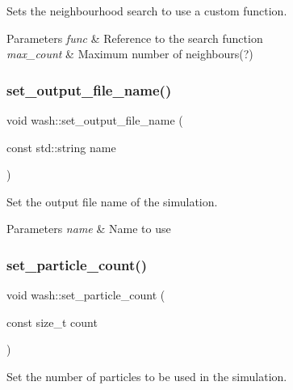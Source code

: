 Sets the neighbourhood search to use a custom function. 


\begin{DoxyParams}{Parameters}
{\em func} & Reference to the search function \\
\hline
{\em max\+\_\+count} & Maximum number of neighbours(?) \\
\hline
\end{DoxyParams}
\mbox{\label{namespacewash_ad6de17b9a27f58f6245a68ede303e84b}} 
\subsubsection{\texorpdfstring{set\+\_\+output\+\_\+file\+\_\+name()}{set\_output\_file\_name()}}
{\footnotesize\ttfamily void wash\+::set\+\_\+output\+\_\+file\+\_\+name (\begin{DoxyParamCaption}\item[{const std\+::string}]{name }\end{DoxyParamCaption})}



Set the output file name of the simulation. 


\begin{DoxyParams}{Parameters}
{\em name} & Name to use \\
\hline
\end{DoxyParams}
\mbox{\label{namespacewash_a20a6940ce5a881482fe472ed704f177e}} 
\subsubsection{\texorpdfstring{set\+\_\+particle\+\_\+count()}{set\_particle\_count()}}
{\footnotesize\ttfamily void wash\+::set\+\_\+particle\+\_\+count (\begin{DoxyParamCaption}\item[{const size\+\_\+t}]{count }\end{DoxyParamCaption})}



Set the number of particles to be used in the simulation. 



